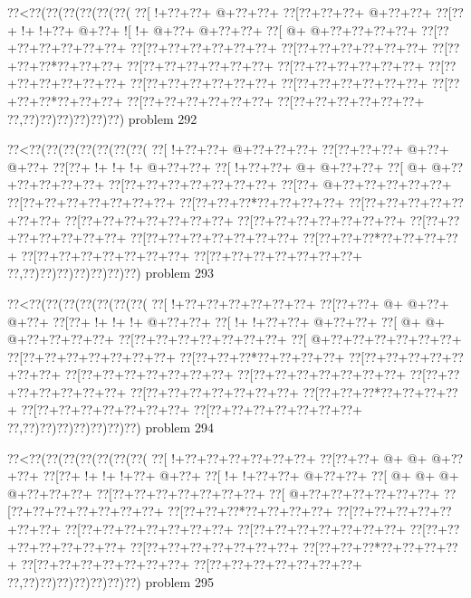 \vbox{\vbox{\goo
\0??<\0??(\0??(\0??(\0??(\0??(\0??(
\0??[\- !+\0??+\0??+\- @+\0??+\0??+
\0??[\0??+\0??+\0??+\- @+\0??+\0??+
\0??[\0??+\- !+\- !+\0??+\- @+\0??+
\- ![\- !+\- @+\0??+\- @+\0??+\0??+
\0??[\- @+\- @+\0??+\0??+\0??+\0??+
\0??[\0??+\0??+\0??+\0??+\0??+\0??+
\0??[\0??+\0??+\0??+\0??+\0??+\0??+
\0??[\0??+\0??+\0??+\0??+\0??+\0??+
\0??[\0??+\0??+\0??*\0??+\0??+\0??+
\0??[\0??+\0??+\0??+\0??+\0??+\0??+
\0??[\0??+\0??+\0??+\0??+\0??+\0??+
\0??[\0??+\0??+\0??+\0??+\0??+\0??+
\0??[\0??+\0??+\0??+\0??+\0??+\0??+
\0??[\0??+\0??+\0??+\0??+\0??+\0??+
\0??[\0??+\0??+\0??*\0??+\0??+\0??+
\0??[\0??+\0??+\0??+\0??+\0??+\0??+
\0??[\0??+\0??+\0??+\0??+\0??+\0??+
\0??,\0??)\0??)\0??)\0??)\0??)\0??)
}
\hfil problem 292\hfil\break
}

\vbox{\vbox{\goo
\0??<\0??(\0??(\0??(\0??(\0??(\0??(\0??(
\0??[\- !+\0??+\0??+\- @+\0??+\0??+\0??+
\0??[\0??+\0??+\0??+\- @+\0??+\- @+\0??+
\0??[\0??+\- !+\- !+\- !+\- @+\0??+\0??+
\0??[\- !+\0??+\0??+\- @+\- @+\0??+\0??+
\0??[\- @+\- @+\0??+\0??+\0??+\0??+\0??+
\0??[\0??+\0??+\0??+\0??+\0??+\0??+\0??+
\0??[\0??+\- @+\0??+\0??+\0??+\0??+\0??+
\0??[\0??+\0??+\0??+\0??+\0??+\0??+\0??+
\0??[\0??+\0??+\0??*\0??+\0??+\0??+\0??+
\0??[\0??+\0??+\0??+\0??+\0??+\0??+\0??+
\0??[\0??+\0??+\0??+\0??+\0??+\0??+\0??+
\0??[\0??+\0??+\0??+\0??+\0??+\0??+\0??+
\0??[\0??+\0??+\0??+\0??+\0??+\0??+\0??+
\0??[\0??+\0??+\0??+\0??+\0??+\0??+\0??+
\0??[\0??+\0??+\0??*\0??+\0??+\0??+\0??+
\0??[\0??+\0??+\0??+\0??+\0??+\0??+\0??+
\0??[\0??+\0??+\0??+\0??+\0??+\0??+\0??+
\0??,\0??)\0??)\0??)\0??)\0??)\0??)\0??)
}
\hfil problem 293\hfil\break
}

\vbox{\vbox{\goo
\0??<\0??(\0??(\0??(\0??(\0??(\0??(\0??(
\0??[\- !+\0??+\0??+\0??+\0??+\0??+\0??+
\0??[\0??+\0??+\- @+\- @+\0??+\- @+\0??+
\0??[\0??+\- !+\- !+\- !+\- @+\0??+\0??+
\0??[\- !+\- !+\0??+\0??+\- @+\0??+\0??+
\0??[\- @+\- @+\- @+\0??+\0??+\0??+\0??+
\0??[\0??+\0??+\0??+\0??+\0??+\0??+\0??+
\0??[\- @+\0??+\0??+\0??+\0??+\0??+\0??+
\0??[\0??+\0??+\0??+\0??+\0??+\0??+\0??+
\0??[\0??+\0??+\0??*\0??+\0??+\0??+\0??+
\0??[\0??+\0??+\0??+\0??+\0??+\0??+\0??+
\0??[\0??+\0??+\0??+\0??+\0??+\0??+\0??+
\0??[\0??+\0??+\0??+\0??+\0??+\0??+\0??+
\0??[\0??+\0??+\0??+\0??+\0??+\0??+\0??+
\0??[\0??+\0??+\0??+\0??+\0??+\0??+\0??+
\0??[\0??+\0??+\0??*\0??+\0??+\0??+\0??+
\0??[\0??+\0??+\0??+\0??+\0??+\0??+\0??+
\0??[\0??+\0??+\0??+\0??+\0??+\0??+\0??+
\0??,\0??)\0??)\0??)\0??)\0??)\0??)\0??)
}
\hfil problem 294\hfil\break
}

\vbox{\vbox{\goo
\0??<\0??(\0??(\0??(\0??(\0??(\0??(\0??(
\0??[\- !+\0??+\0??+\0??+\0??+\0??+\0??+
\0??[\0??+\0??+\- @+\- @+\- @+\0??+\0??+
\0??[\0??+\- !+\- !+\- !+\0??+\- @+\0??+
\0??[\- !+\- !+\0??+\0??+\- @+\0??+\0??+
\0??[\- @+\- @+\- @+\- @+\0??+\0??+\0??+
\0??[\0??+\0??+\0??+\0??+\0??+\0??+\0??+
\0??[\- @+\0??+\0??+\0??+\0??+\0??+\0??+
\0??[\0??+\0??+\0??+\0??+\0??+\0??+\0??+
\0??[\0??+\0??+\0??*\0??+\0??+\0??+\0??+
\0??[\0??+\0??+\0??+\0??+\0??+\0??+\0??+
\0??[\0??+\0??+\0??+\0??+\0??+\0??+\0??+
\0??[\0??+\0??+\0??+\0??+\0??+\0??+\0??+
\0??[\0??+\0??+\0??+\0??+\0??+\0??+\0??+
\0??[\0??+\0??+\0??+\0??+\0??+\0??+\0??+
\0??[\0??+\0??+\0??*\0??+\0??+\0??+\0??+
\0??[\0??+\0??+\0??+\0??+\0??+\0??+\0??+
\0??[\0??+\0??+\0??+\0??+\0??+\0??+\0??+
\0??,\0??)\0??)\0??)\0??)\0??)\0??)\0??)
}
\hfil problem 295\hfil\break
}


